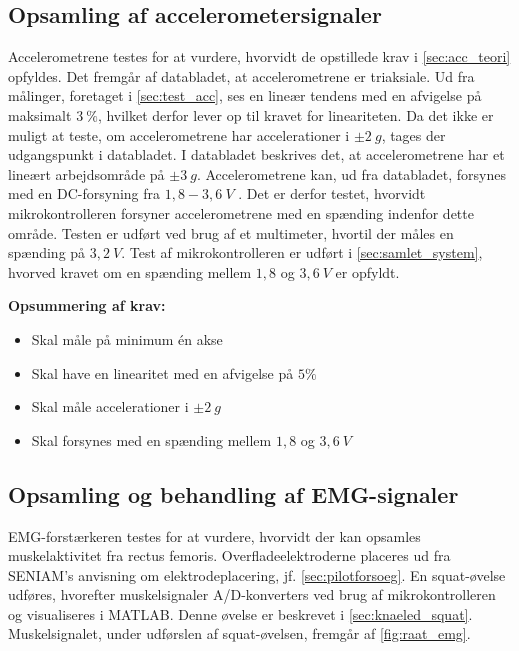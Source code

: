 \subsection{Opsamling af accelerometersignaler}

Accelerometrene testes for at vurdere, hvorvidt de opstillede krav i \autoref{sec:acc_teori} opfyldes. 
Det fremgår af databladet, at accelerometrene er triaksiale.  
Ud fra målinger, foretaget i \autoref{sec:test_acc}, ses en lineær tendens med en afvigelse på maksimalt $3~\%$, hvilket derfor lever op til kravet for lineariteten. 
Da det ikke er muligt at teste, om accelerometrene har accelerationer i $\pm2~g$, tages der udgangspunkt i databladet. 
I databladet beskrives det, at accelerometrene har et lineært arbejdsområde på $\pm 3~g$.
Accelerometrene kan, ud fra databladet, forsynes med en DC-forsyning fra $1,8-3,6~V$ \citep{analogdevices2009}.  
Det er derfor testet, hvorvidt mikrokontrolleren forsyner accelerometrene med en spænding indenfor dette område. 
Testen er udført ved brug af et multimeter, hvortil der måles en spænding på $3,2~V$. 
Test af mikrokontrolleren er udført i \autoref{sec:samlet_system}, hvorved kravet om en spænding mellem $1,8$ og $3,6~V$ er opfyldt.

\vspace{3mm}
\textbf{Opsummering af krav:}
\begin{itemize}
\item[\text{\sffamily \checkmark}] Skal måle på minimum én akse
\item[\text{\sffamily \checkmark}] Skal have en linearitet med en afvigelse på $5\%$
\item[\text{\sffamily \checkmark}] Skal måle accelerationer i $\pm2~g$
\item[\text{\sffamily \checkmark}] Skal forsynes med en spænding mellem $1,8$ og $3,6~V$
\end{itemize}


\subsection{Opsamling og behandling af EMG-signaler}

EMG-forstærkeren testes for at vurdere, hvorvidt der kan opsamles muskelaktivitet fra rectus femoris. 
Overfladeelektroderne placeres ud fra SENIAM's anvisning om elektrodeplacering, jf. \autoref{sec:pilotforsoeg}. 
En squat-øvelse udføres, hvorefter muskelsignaler A/D-konverters ved brug af mikrokontrolleren og visualiseres i MATLAB. 
Denne øvelse er beskrevet i \autoref{sec:knaeled_squat}. 
Muskelsignalet, under udførslen af squat-øvelsen, fremgår af \autoref{fig:raat_emg}. 

